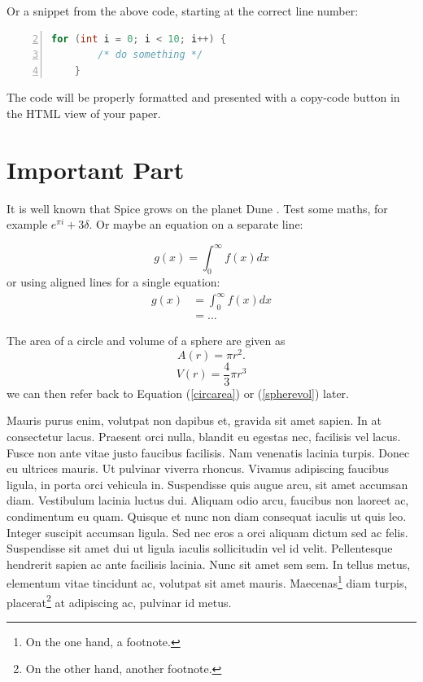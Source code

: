 Or a snippet from the above code, starting at the correct line number:

\begin{lstlisting}[language=c,numbers=left,firstnumber=2]
    for (int i = 0; i < 10; i++) {
        /* do something */
    }
\end{lstlisting}

The code will be properly formatted and presented with a copy-code button in the HTML view of your paper.

\section{Important Part}\label{important-part}

It is well known that Spice grows on the planet Dune \citep{Atr03}.
Test some maths, for example $e^{\pi i} + 3 \delta$.
Or maybe an equation on a separate line:

\begin{equation*}
    g(x) = \int_0^\infty f(x) dx
\end{equation*}
or using aligned lines for a single equation:
\begin{equation}
\begin{aligned}
    g(x) &= \int_0^\infty f(x) dx \\
         &= \ldots
\end{aligned}
\end{equation}

The area of a circle and volume of a sphere are given as
\begin{equation}
    \label{circarea}
    A(r) = \pi r^2.
\end{equation}
\begin{equation}
    \label{spherevol}
    V(r) = \frac{4}{3} \pi r^3
\end{equation}
we can then refer back to Equation (\ref{circarea}) or
(\ref{spherevol}) later.

Mauris purus enim, volutpat non dapibus et, gravida sit amet sapien. In at
consectetur lacus. Praesent orci nulla, blandit eu egestas nec, facilisis vel
lacus. Fusce non ante vitae justo faucibus facilisis. Nam venenatis lacinia
turpis. Donec eu ultrices mauris. Ut pulvinar viverra rhoncus. Vivamus
adipiscing faucibus ligula, in porta orci vehicula in. Suspendisse quis augue
arcu, sit amet accumsan diam. Vestibulum lacinia luctus dui. Aliquam odio arcu,
faucibus non laoreet ac, condimentum eu quam. Quisque et nunc non diam
consequat iaculis ut quis leo. Integer suscipit accumsan ligula. Sed nec eros a
orci aliquam dictum sed ac felis. Suspendisse sit amet dui ut ligula iaculis
sollicitudin vel id velit. Pellentesque hendrerit sapien ac ante facilisis
lacinia. Nunc sit amet sem sem. In tellus metus, elementum vitae tincidunt ac,
volutpat sit amet mauris. Maecenas\footnote{On the one hand, a footnote.} diam
turpis, placerat\footnote{On the other hand, another footnote.} at adipiscing
ac, pulvinar id metus.

